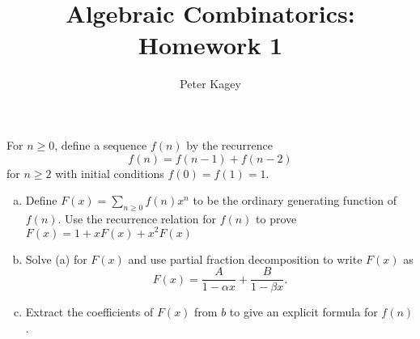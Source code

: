 \documentclass{article}
\newenvironment{problem}[2][Problem]{\begin{trivlist}
\item[\hskip \labelsep {\bfseries #1}\hskip \labelsep {\bfseries #2.}]}{\end{trivlist}}
\begin{document}
\title{Algebraic Combinatorics: Homework 1}
\author{Peter Kagey}

\maketitle

\begin{problem}{1}
  For $n \geq 0$, define a sequence $f(n)$ by the recurrence \[
    f(n) = f(n-1) + f(n-2)
  \] for $n \geq 2$ with initial conditions $f(0) = f(1) = 1$.
  \begin{enumerate}[(a)]
    \item Define $F(x) = \sum_{n\geq0} f(n) x^n$ to be the ordinary generating
    function of $f(n)$. Use the recurrence relation for $f(n)$ to prove
    $F(x) = 1 + xF(x) + x^2F(x)$
    \item Solve (a) for $F(x)$ and use partial fraction decomposition to write
    $F(x)$ as \[
      F(x) = \frac{A}{1 - \alpha x} + \frac B{1 - \beta x}.
    \]
    \item Extract the coefficients of $F(x)$ from $b$ to give an explicit
    formula for $f(n)$.
  \end{enumerate}
\end{problem}
\end{document}
